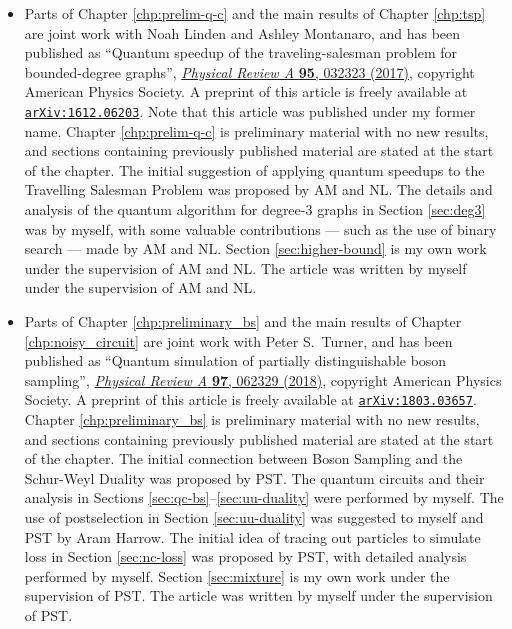 \begin{itemize}
\item Parts of Chapter \ref{chp:prelim-q-c} and the main results of Chapter \ref{chp:tsp} are joint work with Noah Linden and Ashley Montanaro, and has been published as ``Quantum speedup of the traveling-salesman problem for bounded-degree graphs'', \href{https://link.aps.org/doi/10.1103/PhysRevA.95.032323}{\textit{Physical Review A} \textbf{95}, 032323 (2017)}, copyright American Physics Society. A preprint of this article is freely available at {\tt \href{https://arxiv.org/abs/1612.06203}{arXiv:1612.06203}}. Note that this article was published under my former name. Chapter \ref{chp:prelim-q-c} is preliminary material with no new results, and sections containing previously published material are stated at the start of the chapter. The initial suggestion of applying quantum speedups to the Travelling Salesman Problem was proposed by AM and NL. The details and analysis of the quantum algorithm for degree-3 graphs in Section \ref{sec:deg3} was by myself, with some valuable contributions --- such as the use of binary search --- made by AM and NL. Section \ref{sec:higher-bound} is my own work under the supervision of AM and NL. The article was written by myself under the supervision of AM and NL.

\item Parts of Chapter \ref{chp:preliminary_bs} and the main results of Chapter \ref{chp:noisy_circuit} are joint work with Peter S.\ Turner, and has been published as ``Quantum simulation of partially distinguishable boson sampling'', \href{https://link.aps.org/doi/10.1103/PhysRevA.97.062329}{\textit{Physical Review A} \textbf{97}, 062329 (2018)}, copyright American Physics Society. A preprint of this article is freely available at {\tt \href{https://arxiv.org/abs/1803.03657}{arXiv:1803.03657}}. Chapter \ref{chp:preliminary_bs} is preliminary material with no new results, and sections containing previously published material are stated at the start of the chapter. The initial connection between Boson Sampling and the Schur-Weyl Duality was proposed by PST. The quantum circuits and their analysis in Sections \ref{sec:qc-bs}--\ref{sec:uu-duality} were performed by myself. The use of postselection in Section \ref{sec:uu-duality} was suggested to myself and PST by Aram Harrow. The initial idea of tracing out particles to simulate loss in Section \ref{sec:nc-loss} was proposed by PST, with detailed analysis performed by myself. Section \ref{sec:mixture} is my own work under the supervision of PST. The article was written by myself under the supervision of PST.


\end{itemize}
